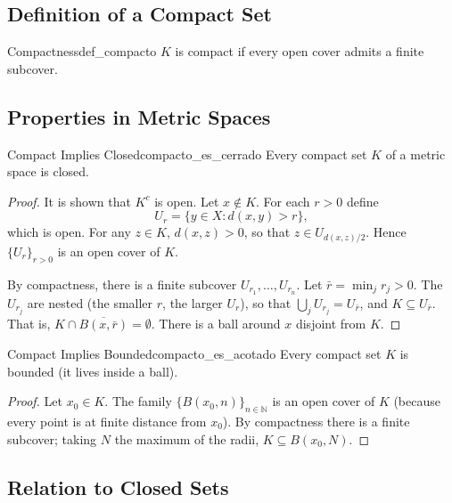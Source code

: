 \documentclass[11pt, a4paper]{article}
\begin{document}
\subsection{Definition of a Compact Set}

\begin{definicion}{Compactness}{def_compacto}
$K$ is compact if every open cover admits a finite subcover.
\end{definicion}

\subsection{Properties in Metric Spaces}

\begin{proposicion}{Compact Implies Closed}{compacto_es_cerrado}
Every compact set $K$ of a metric space is closed.
\end{proposicion}

\begin{proof}
It is shown that $K^c$ is open. Let $x \notin K$. For each $r > 0$ define
$$ U_r = \{y \in X : d(x, y) > r\}, $$
which is open. For any $z \in K$, $d(x,z) > 0$, so that $z \in U_{d(x,z)/2}$. Hence
$\{U_r\}_{r > 0}$ is an open cover of $K$.

By compactness, there is a finite subcover $U_{r_1}, \dots, U_{r_n}$. Let
$\bar{r} = \min_j r_j > 0$. The $U_{r_j}$ are nested (the smaller $r$, the larger $U_r$), so that
$\bigcup_j U_{r_j} = U_{\bar r}$, and $K \subseteq U_{\bar r}$. That is,
$K \cap \overline{B(x, \bar r)} = \emptyset$. There is a ball around $x$ disjoint from $K$.
\end{proof}

\begin{proposicion}{Compact Implies Bounded}{compacto_es_acotado}
Every compact set $K$ is bounded (it lives inside a ball).
\end{proposicion}

\begin{proof}
Let $x_0 \in K$. The family $\{B(x_0, n)\}_{n \in \mathbb{N}}$ is an open cover of $K$
(because every point is at finite distance from $x_0$). By compactness there is a finite subcover;
taking $N$ the maximum of the radii, $K \subseteq B(x_0, N)$.
\end{proof}

\subsection{Relation to Closed Sets}
\end{document}
